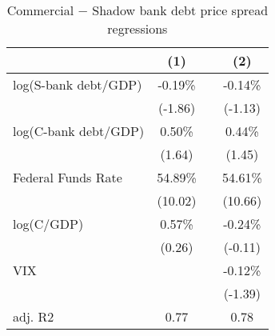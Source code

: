 \documentclass[letterpaper,12pt,dvipsnames,usenames]{article}
\theoremstyle{plain}
\begin{document}
\clearpage 
\newpage

\begin{table}[!ht] 
\caption{Commercial $-$ Shadow bank debt price spread regressions}
\centering{}{\small{} }%

\begin{tabular}{lccc}
\toprule
   & (1)  & & (2) \\    
 \midrule 
log(S-bank debt/GDP)  & -0.19\%  & & -0.14\%        \\    
                                           & (-1.86)    &  & (-1.13)  \\
log(C-bank debt/GDP)   &  0.50\% &  & 0.44\%  \\                
									       & (1.64)     & & (1.45)     \\
Federal Funds Rate          & 54.89\%  & &  54.61\%  \\         
										   & (10.02)   &  & (10.66)    \\         
log(C/GDP)                       & 0.57\%    & &  -0.24\%   \\                  
   									      & (0.26)    & &   (-0.11) \\        
 VIX                                     &            &   &  -0.12\%  \\                 
                                            &            &   &   (-1.39)   \\                 
 \midrule 
adj. R2                                 &  0.77  &   & 0.78         \\      
\bottomrule

\end{tabular}
\label{tab:cal_gameps}
 \end{table}
\end{document}
